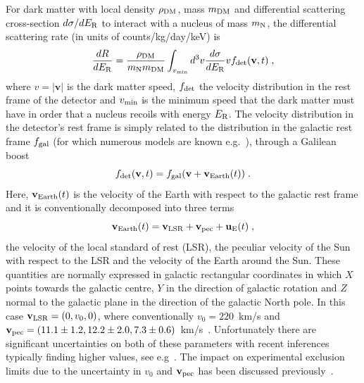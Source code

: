 \documentclass[preprintnumbers,a4paper,twocolumn,floats,nofootinbib,superscriptaddress,aps,prd]{revtex4-1}
\newcommand{\Er}{E_{\rm{R}}}
\begin{document}
For dark matter with local density $\rho_{\rm{DM}}$, mass $m_{\rm{DM}}$ and differential scattering cross-section $d\sigma/d\Er$ to interact with a nucleus of mass $m_{\rm{N}}$, the differential scattering rate (in units of counts/kg/day/keV) is
\begin{equation}
\frac{d R}{d \Er}=\frac{\rho_{\rm{DM}}}{m_{\rm{N}} m_{\rm{DM}}}\int_{v_{\rm{min}}}d^3 v \frac{d \sigma}{d \Er} v f_{\rm{det}}(\mathbf{v},t) \;,
\end{equation}
where $v=|\mathbf{v}|$ is the dark matter speed, $f_{\rm{det}}$ the velocity distribution in the rest frame of the detector and $v_{\rm{min}}$ is the minimum speed that the dark matter must have in order that a nucleus recoils with energy $\Er$. The velocity distribution in the detector's rest frame is simply related to the distribution in the galactic rest frame $f_{\rm{gal}}$ (for which numerous models are known e.g.~\cite{Binney2008,Evans:2000gr,Evans:2005tn,Chaudhury:2010hj,Bozorgnia:2013pua,Hunter:2013vua,Fornasa:2013iaa}), through a Galilean boost
\begin{equation}
f_{\rm{det}}(\mathbf{v},t)=f_{\rm{gal}}(\mathbf{v}+\mathbf{v}_{\rm{Earth}}(t))\;.
\end{equation}
Here, $\mathbf{v}_{\rm{Earth}}(t)$ is the velocity of the Earth with respect to the galactic rest frame and it is conventionally decomposed into three terms
\begin{equation}
 \mathbf{v}_{\rm{Earth}}(t)=\mathbf{v}_{\rm{LSR}}+\mathbf{v}_{\rm{pec}}+\mathbf{u}_{\rm{E}}(t)\;,
 \end{equation}
the velocity of the local standard of rest (LSR), the peculiar velocity of the Sun with respect to the LSR and the velocity of the Earth around the Sun. These quantities are normally expressed in galactic rectangular coordinates in which $X$ points towards the galactic centre, $Y$ in the direction of galactic rotation and $Z$ normal to the galactic plane in the direction of the galactic North pole. In this case $\mathbf{v}_{\rm{LSR}}=(0,v_0,0)$, where conventionally $v_0=220$~km/s and \mbox{$\mathbf{v}_{\rm{pec}}=(11.1\pm1.2,12.2\pm2.0,7.3\pm0.6)$}~km/s~\cite{Schoenrich:2009bx}. Unfortunately there are significant uncertainties on both of these parameters with recent inferences typically finding higher values, see e.g~\cite{Schonrich:2012qz,Bovy:2012ba}. The impact on experimental exclusion limits due to the uncertainty in $v_0$ and $\mathbf{v}_{\rm{pec}}$ has been discussed previously~\cite{McCabe:2010zh}.
\end{document}

